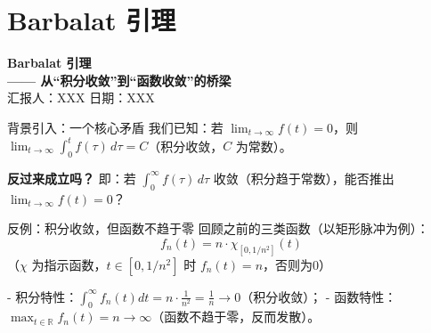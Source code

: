\section{Barbalat 引理}

\usepackage{amsmath,amssymb,graphicx,subfigure,hyperref}
\newcommand{\R}{\mathbb{R}} %
\newcommand{\abs}[1]{\left| #1 \right|} %
\newcommand{\intlim}[2]{\int_{#1}^{\infty} #2 \, dt} %
\newcommand{\intt}[2]{\int_{0}^{#1} #2 \, d\tau} %

\begin{frame}
  \centering
  \vspace{2cm}
  \Huge{\textbf{Barbalat 引理}} \\
  \vspace{1cm}
  \Large{\textbf{—— 从“积分收敛”到“函数收敛”的桥梁}} \\
  \vspace{3cm}
  \small{汇报人：XXX \quad 日期：XXX}
\end{frame}

\begin{frame}{背景引入：一个核心矛盾}
  我们已知：若 $\lim_{t \to \infty} f(t) = 0$，则 $\lim_{t \to \infty} \intt{t}{f(\tau)} = C$（积分收敛，$C$ 为常数）。
  
  \vspace{0.5cm}
  \textbf{反过来成立吗？}  
  即：若 $\intt{\infty}{f(\tau)}$ 收敛（积分趋于常数），能否推出 $\lim_{t \to \infty} f(t) = 0$？

  \vspace{0.8cm}
  \begin{block}{反例：积分收敛，但函数不趋于零}
    回顾之前的三类函数（以矩形脉冲为例）：
    \[ f_n(t) = n \cdot \chi_{[0, 1/n^2]}(t) \]
    （$\chi$ 为指示函数，$t \in [0,1/n^2]$ 时 $f_n(t)=n$，否则为0）
    
    - 积分特性：$\int_0^\infty f_n(t)dt = n \cdot \frac{1}{n^2} = \frac{1}{n} \to 0$（积分收敛）；
    - 函数特性：$\max_{t \in \R} f_n(t) = n \to \infty$（函数不趋于零，反而发散）。
  \end{block}
\end{frame}

